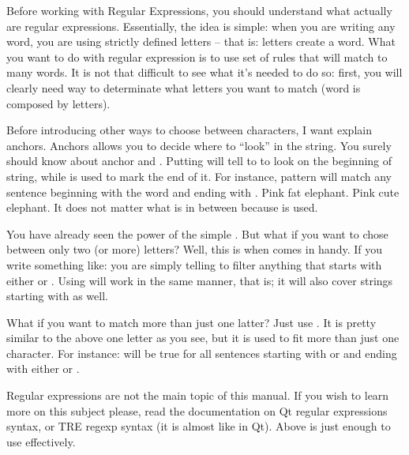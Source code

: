 Before working with Regular Expressions, you should understand what actually are regular expressions. Essentially, the idea is simple:
when you are writing any word, you are using strictly defined letters -- that is: letters create a word. What you want to do with regular
expression is to use set of rules that will match to many words. It is not that difficult to see what it's needed to do so: first,
you will clearly need way to determinate what letters you want to match (word is composed by letters).

Before introducing other ways to choose between characters, I want explain anchors. Anchors allows you to decide where to ``look'' in the string.
You surely should know about \mono{\textasciicircum} anchor and \mono{\textdollar}. Putting \mono{\textasciicircum} will tell to \OCS{}
to look on the beginning of string, while \mono{\textdollar} is used to mark the end of it. For instance, pattern
 will match any sentence beginning with the word  and ending with
. Pink fat elephant. Pink cute elephant. It does not matter what is in between because  is used.

You have already seen the power of the simple . But what if you want to chose between only two (or more) letters? Well, this is when
\mono{[|]} comes in handy. If you write something like:  you are simply telling \OCS{} to filter anything that
starts with either  or . Using  will work in the same manner, that is; it will also cover strings starting with  as well.

What if you want to match more than just one latter? Just use \mono{(|)}. It is pretty similar to the above one letter as you see, but it is
used to fit more than just one character. For instance:  will be
true for all sentences starting with  or  and ending with either  or .

Regular expressions are not the main topic of this manual. If you wish to learn more on this subject please, read the documentation on
Qt regular expressions syntax, or TRE regexp syntax (it is almost like in Qt). Above is just enough to use \OCS{} effectively.

